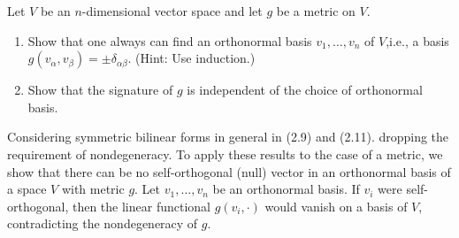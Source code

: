 \begin{problem}
    Let $V$ be an $n$-dimensional vector space and let $g$ be a metric on $V$.
    \begin{enumerate}[label=(\alph*)]
        \item Show that one always can find an orthonormal basis $v_1, \ldots , v_n$ of $V$,i.e., a basis $g(v_\alpha,v_\beta)=\pm\delta_{\alpha\beta}$. (Hint: Use induction.)
        \item Show that the signature of $g$ is independent of the choice of orthonormal basis.
    \end{enumerate}
\end{problem}
\begin{solution}
    Considering symmetric bilinear forms in general in (2.9) and (2.11). dropping the requirement of nondegeneracy. To apply these results to the case of a metric, we show that there can be no self-orthogonal (null) vector in an orthonormal basis of a space $V$ with metric $g$. Let $v_1,\ldots,v_n$ be an orthonormal basis. If $v_i$ were self-orthogonal, then the linear functional $g(v_i,\cdot)$ would vanish on a basis of $V$, contradicting the nondegeneracy of $g$.
\end{solution}

